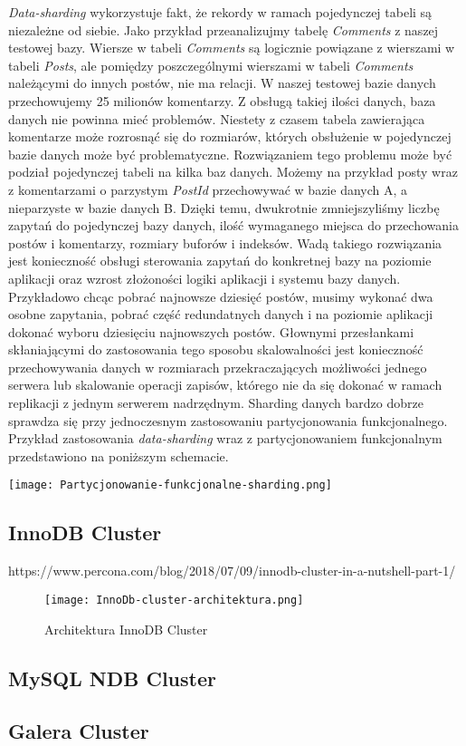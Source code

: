 \textit{Data-sharding} wykorzystuje fakt, że rekordy w ramach pojedynczej tabeli są niezależne od siebie. Jako przykład przeanalizujmy tabelę \textit{Comments} z naszej testowej bazy.
Wiersze w tabeli \textit{Comments} są logicznie powiązane z wierszami w tabeli \textit{Posts}, ale pomiędzy poszczególnymi wierszami w tabeli \textit{Comments} należącymi do innych postów, nie ma relacji. W naszej testowej bazie danych przechowujemy 25 milionów komentarzy. Z obsługą takiej ilości danych, baza danych nie powinna mieć problemów. Niestety z czasem tabela zawierająca komentarze może rozrosnąć się do rozmiarów, których obsłużenie w pojedynczej bazie danych może być problematyczne. Rozwiązaniem tego problemu może być podział pojedynczej tabeli na kilka baz danych. Możemy na przykład posty wraz z komentarzami o parzystym \textit{PostId} przechowywać w bazie danych A, a nieparzyste w bazie danych B. Dzięki temu, dwukrotnie zmniejszyliśmy liczbę zapytań do pojedynczej bazy danych, ilość wymaganego miejsca do przechowania postów i komentarzy, rozmiary buforów i indeksów. Wadą takiego rozwiązania jest konieczność obsługi sterowania zapytań do konkretnej bazy na poziomie aplikacji oraz wzrost złożoności logiki aplikacji i systemu bazy danych. Przykładowo chcąc pobrać najnowsze dziesięć postów, musimy wykonać dwa osobne zapytania, pobrać część redundatnych danych i na poziomie aplikacji dokonać wyboru dziesięciu najnowszych postów.
Głownymi przesłankami skłaniającymi do zastosowania tego sposobu skalowalności jest konieczność przechowywania danych w rozmiarach przekraczających możliwości jednego serwera lub skalowanie operacji zapisów, którego nie da się dokonać w ramach replikacji z jednym serwerem nadrzędnym. Sharding danych bardzo dobrze sprawdza się przy jednoczesnym zastosowaniu partycjonowania funkcjonalnego. Przykład zastosowania \textit{data-sharding} wraz z partycjonowaniem funkcjonalnym przedstawiono na poniższym schemacie.
\begin{center}
	\texttt{[image: Partycjonowanie-funkcjonalne-sharding.png]} 
\end{center}

\subsection{InnoDB Cluster}
https://www.percona.com/blog/2018/07/09/innodb-cluster-in-a-nutshell-part-1/

\begin{figure}[!h]
	\caption{Architektura InnoDB Cluster}
	\centering
	\texttt{[image: InnoDb-cluster-architektura.png]}
	\label{fig:label}
\end{figure}

\subsection{MySQL NDB Cluster}


\subsection{Galera Cluster}